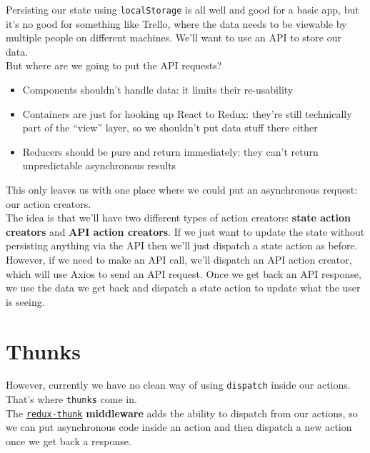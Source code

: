Persisting our state using \texttt{localStorage} is all well and good for a basic app, but it's no good for something like Trello, where the data needs to be viewable by multiple people on different machines. We'll want to use an API to store our data.
\\

But where are we going to put the API requests?

\begin{itemize}
    \item Components shouldn't handle data: it limits their re-usability
    \item Containers are just for hooking up React to Redux: they're still technically part of the ``view'' layer, so we shouldn't put data stuff there either
    \item Reducers should be pure and return immediately: they can't return unpredictable asynchronous results
\end{itemize}

This only leaves us with one place where we could put an asynchronous request: our action creators.
\\

The idea is that we'll have two different types of action creators: \textbf{state action creators} and \textbf{API action creators}. If we just want to update the state without persisting anything via the API then we'll just dispatch a state action as before. However, if we need to make an API call, we'll dispatch an API action creator, which will use Axios to send an API request. Once we get back an API response, we use the data we get back and dispatch a state action to update what the user is seeing.



\section{Thunks}

However, currently we have no clean way of using \texttt{dispatch} inside our actions. That's where \texttt{thunks} come in.
\\

The \href{https://github.com/gaearon/redux-thunk}{\texttt{redux-thunk}} \textbf{middleware} adds the ability to dispatch from our actions, so we can put asynchronous code inside an action and then dispatch a new action once we get back a response.
\\

